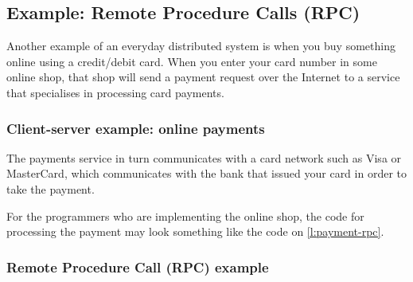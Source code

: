 \subsection{Example: Remote Procedure Calls (RPC)}\label{sec:rpc}

Another example of an everyday distributed system is when you buy something online using a credit/debit card.
When you enter your card number in some online shop, that shop will send a payment request over the Internet to a service that specialises in processing card payments.

\begin{frame}
    \label{s:payment-example}
    \frametitle{Client-server example: online payments}
    \begin{center}
    \end{center}
\end{frame}

The payments service in turn communicates with a card network such as Visa or MasterCard, which communicates with the bank that issued your card in order to take the payment.

For the programmers who are implementing the online shop, the code for processing the payment may look something like the code on \autoref{l:payment-rpc}.

\begin{frame}
    \label{s:payment-rpc}
    \frametitle{Remote Procedure Call (RPC) example}
    \inputminted{java}{code/payment-rpc.java}
\end{frame}
\label{l:payment-rpc}

